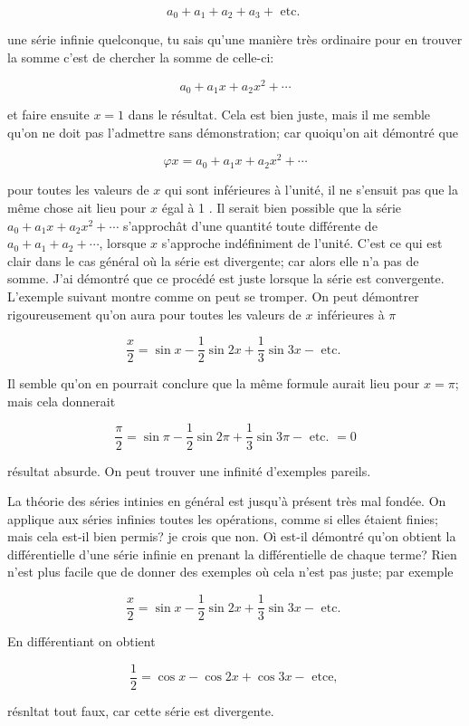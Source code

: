\documentclass{article}
\begin{document}
\[
a_{0}+a_{1}+a_{2}+a_{3}+\text { etc. }
\]

une série infinie quelconque, tu sais qu'une manière très ordinaire pour en trouver la somme c'est de chercher la somme de celle-ci:

\[
a_{0}+a_{1} x+a_{2} x^{2}+\cdots
\]

et faire ensuite \(x=1\) dans le résultat. Cela est bien juste, mais il me semble qu'on ne doit pas l'admettre sans démonstration; car quoiqu'on ait démontré que

\[
\varphi x=a_{0}+a_{1} x+a_{2} x^{2}+\cdots
\]

pour toutes les valeurs de \(x\) qui sont inférieures à l'unité, il ne s'ensuit pas que la même chose ait lieu pour \(x\) égal à 1 . Il serait bien possible que la série \(a_{0}+a_{1} x+a_{2} x^{2}+\cdots\) s'approchât d'une quantité toute différente de \(a_{0}+a_{1}+a_{2}+\cdots\), lorsque \(x\) s'approche indéfiniment de l'unité. C'est ce qui est clair dans le cas général où la série est divergente; car alors elle n'a pas de somme. J'ai démontré que ce procédé est juste lorsque la série est convergente. L'exemple suivant montre comme on peut se tromper. On peut démontrer rigoureusement qu'on aura pour toutes les valeurs de \(x\) inférieures à \(\pi\)

\[
\frac{x}{2}=\sin x-\frac{1}{2} \sin 2 x+\frac{1}{3} \sin 3 x-\text { etc. }
\]

Il semble qu'on en pourrait conclure que la même formule aurait lieu pour \(x=\pi\); mais cela donnerait

\[
\frac{\pi}{2}=\sin \pi-\frac{1}{2} \sin 2 \pi+\frac{1}{3} \sin 3 \pi-\text { etc. }=0
\]

résultat absurde. On peut trouver une infinité d'exemples pareils.

La théorie des séries intinies en général est jusqu'à présent très mal fondée. On applique aux séries infinies toutes les opérations, comme si elles étaient finies; mais cela est-il bien permis? je crois que non. Oì est-il démontré qu'on obtient la différentielle d'une série infinie en prenant la différentielle de chaque terme? Rien n'est plus facile que de donner des exemples où cela n'est pas juste; par exemple

\[
\frac{x}{2}=\sin x-\frac{1}{2} \sin 2 x+\frac{1}{3} \sin 3 x-\text { etc. }
\]

En différentiant on obtient

\[
\frac{1}{2}=\cos x-\cos 2 x+\cos 3 x-\text { etce, }
\]

résnltat tout faux, car cette série est divergente.
\end{document}
